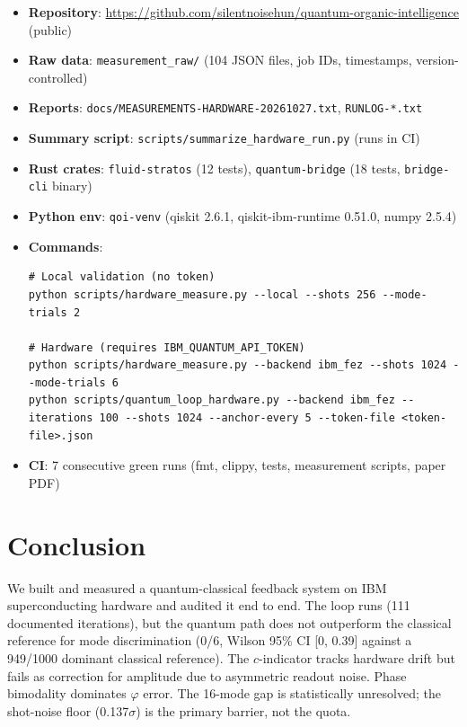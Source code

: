 \documentclass[sigconf,anonymous=false]{acmart}
\begin{document}
\begin{itemize}
\item \textbf{Repository}: \url{https://github.com/silentnoisehun/quantum-organic-intelligence} (public)
\item \textbf{Raw data}: \texttt{measurement\_raw/} (104 JSON files, job IDs, timestamps, version-controlled)
\item \textbf{Reports}: \texttt{docs/MEASUREMENTS-HARDWARE-20261027.txt}, \texttt{RUNLOG-*.txt}
\item \textbf{Summary script}: \texttt{scripts/summarize\_hardware\_run.py} (runs in CI)
\item \textbf{Rust crates}: \texttt{fluid-stratos} (12 tests), \texttt{quantum-bridge} (18 tests, \texttt{bridge-cli} binary)
\item \textbf{Python env}: \texttt{qoi-venv} (qiskit 2.6.1, qiskit-ibm-runtime 0.51.0, numpy 2.5.4)
\item \textbf{Commands}:
\begin{verbatim}
# Local validation (no token)
python scripts/hardware_measure.py --local --shots 256 --mode-trials 2

# Hardware (requires IBM_QUANTUM_API_TOKEN)
python scripts/hardware_measure.py --backend ibm_fez --shots 1024 --mode-trials 6
python scripts/quantum_loop_hardware.py --backend ibm_fez --iterations 100 --shots 1024 --anchor-every 5 --token-file <token-file>.json
\end{verbatim}
\item \textbf{CI}: 7 consecutive green runs (fmt, clippy, tests, measurement scripts, paper PDF)
\end{itemize}

\section{Conclusion}

We built and measured a quantum-classical feedback system on IBM superconducting hardware and audited it end to end. The loop runs (111 documented iterations), but the quantum path does not outperform the classical reference for mode discrimination (0/6, Wilson 95\% CI [0, 0.39] against a 949/1000 dominant classical reference). The $c$-indicator tracks hardware drift but fails as correction for amplitude due to asymmetric readout noise. Phase bimodality dominates $\varphi$ error. The 16-mode gap is statistically unresolved; the shot-noise floor (0.137$\sigma$) is the primary barrier, not the quota.
\end{document}
